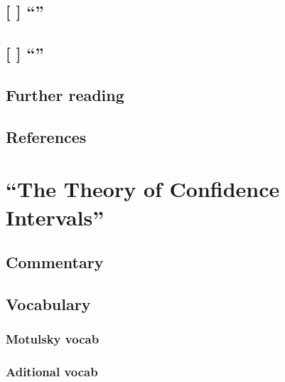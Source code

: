 \documentclass[]{book}
\theoremstyle{definition}
\theoremstyle{definition}
\theoremstyle{definition}
\theoremstyle{remark}
\begin{document}
\section{\texorpdfstring{{[} {]} ``''}{{[} {]} }}\label{section-16}

\section{\texorpdfstring{{[} {]} ``''}{{[} {]} }}\label{section-17}

\section*{Further reading}\label{further-reading-10}

\section*{References}\label{references-10}

\chapter{\texorpdfstring{``The Theory of Confidence
Intervals''}{The Theory of Confidence Intervals}}\label{ch13}

\section*{Commentary}\label{commentary-11}

\section*{Vocabulary}\label{vocabulary-12}

\subsection*{Motulsky vocab}\label{motulsky-vocab-12}

\subsection*{Aditional vocab}\label{aditional-vocab-9}
\end{document}
